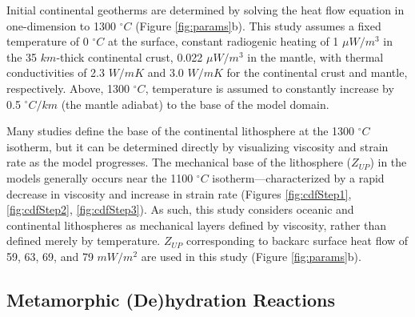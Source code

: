 Initial continental geotherms are determined by solving the heat flow equation in one-dimension to 1300 \(^{\circ}C\) (Figure \ref{fig:params}b). This study assumes a fixed temperature of 0 \(^{\circ}C\) at the surface, constant radiogenic heating of 1 \(\mu W/m^{3}\) in the 35 \(km\)-thick continental crust, 0.022 \(\mu W/m^{3}\) in the mantle, with thermal conductivities of 2.3 \(W/mK\) and 3.0 \(W/mK\) for the continental crust and mantle, respectively. Above, 1300 \(^{\circ}C\), temperature is assumed to constantly increase by 0.5 \(^{\circ}C/km\) (the mantle adiabat) to the base of the model domain.

Many studies define the base of the continental lithosphere at the 1300 \(^{\circ}C\) isotherm, but it can be determined directly by visualizing viscosity and strain rate as the model progresses. The mechanical base of the lithosphere (\(Z_{UP}\)) in the models generally occurs near the 1100 \(^{\circ}C\) isotherm---characterized by a rapid decrease in viscosity and increase in strain rate (Figures \ref{fig:cdfStep1}, \ref{fig:cdfStep2}, \ref{fig:cdfStep3}). As such, this study considers oceanic and continental lithospheres as mechanical layers defined by viscosity, rather than defined merely by temperature. \(Z_{UP}\) corresponding to backarc surface heat flow of 59, 63, 69, and 79 \(mW/m^{2}\) are used in this study (Figure \ref{fig:params}b).

\hypertarget{numHydration}{%
\subsection{Metamorphic (De)hydration Reactions}\label{numHydration}}

